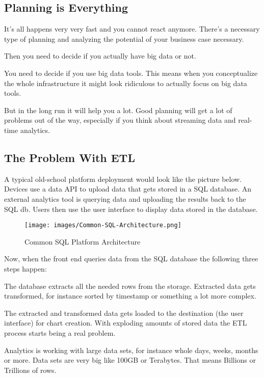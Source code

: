 \documentclass[12pt, numbers=noenddot]{scrreprt} %
\begin{document}
\subsection{Planning is Everything}

It’s all happens very very fast and you cannot react anymore. There’s a necessary type of planning and analyzing the potential of your business case necessary.

Then you need to decide if you actually have big data or not.

You need to decide if you use big data tools. This means when you conceptualize the whole infrastructure it might look ridiculous to actually focus on big data tools.

But in the long run it will help you a lot. Good planning will get a lot of problems out of the way, especially if you think about streaming data and real-time analytics.

\subsection{The Problem With ETL}
A typical old-school platform deployment would look like the picture below. Devices use a data API to upload data that gets stored in a SQL database. An external analytics tool is querying data and uploading the results back to the SQL db. Users then use the user interface to display data stored in the database.

\begin{figure}[htbp]
  \centering
     \texttt{[image: images/Common-SQL-Architecture.png]}
  \caption{Common SQL Platform Architecture}
  \label{fig:Bild1}
\end{figure}

Now, when the front end queries data from the SQL database the following three steps happen:

The database extracts all the needed rows from the storage. Extracted data gets transformed, for instance sorted by timestamp or something a lot more complex.

The extracted and transformed data gets loaded to the destination (the user interface) for chart creation.
With exploding amounts of stored data the ETL process starts being a real problem.

Analytics is working with large data sets, for instance whole days, weeks, months or more. Data sets are very big like 100GB or Terabytes. That means Billions or Trillions of rows.
\end{document}
